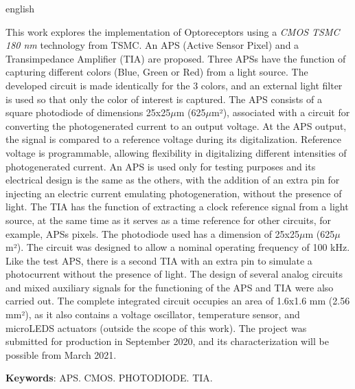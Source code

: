 
\begin{resumo}[Abstract]
 \begin{otherlanguage*}{english}

This work explores the implementation of Optoreceptors using a \textit{CMOS TSMC 180 nm} technology from TSMC. An APS (Active Sensor Pixel) and a Transimpedance Amplifier (TIA) are proposed. Three APSs have the function of capturing different colors (Blue, Green or Red) from a light source. The developed circuit is made identically for the 3 colors, and an external light filter is used so that only the color of interest is captured. The APS consists of a square photodiode of dimensions 25x25$\mu$m (625$\mu$m²), associated with a circuit for converting the photogenerated current to an output voltage. At the APS output, the signal is compared to a reference voltage during its digitalization. Reference voltage is programmable, allowing flexibility in digitalizing different intensities of photogenerated current. An APS is used only for testing purposes and its electrical design is the same as the others, with the addition of an extra pin for injecting an electric current emulating photogeneration, without the presence of light. The TIA has the function of extracting a clock reference signal from a light source, at the same time as it serves as a time reference for other circuits, for example, APSs pixels. The photodiode used has a dimension of 25x25$\mu$m (625$\mu$m²). The circuit was designed to allow a nominal operating frequency of 100 kHz. Like the test APS, there is a second TIA with an extra pin to simulate a photocurrent without the presence of light. The design of several analog circuits and mixed auxiliary signals for the functioning of the APS and TIA were also carried out. The complete integrated circuit occupies an area of 1.6x1.6 mm (2.56 mm²), as it also contains a voltage oscillator, temperature sensor, and microLEDS actuators (outside the scope of this work). The project was submitted for production in September 2020, and its characterization will be possible from March 2021.

   \vspace{\onelineskip}
 
   \noindent 
   \textbf{Keywords}: APS. CMOS. PHOTODIODE. TIA.
 \end{otherlanguage*}
\end{resumo}